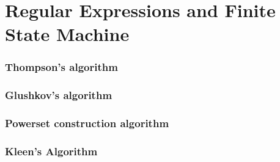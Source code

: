 \section{Regular Expressions and Finite State Machine}

\subsubsection{Thompson's algorithm}
	
	\subsubsection{Glushkov's algorithm}
	
	\subsubsection{Powerset construction algorithm}
	
	\subsubsection{Kleen's Algorithm}